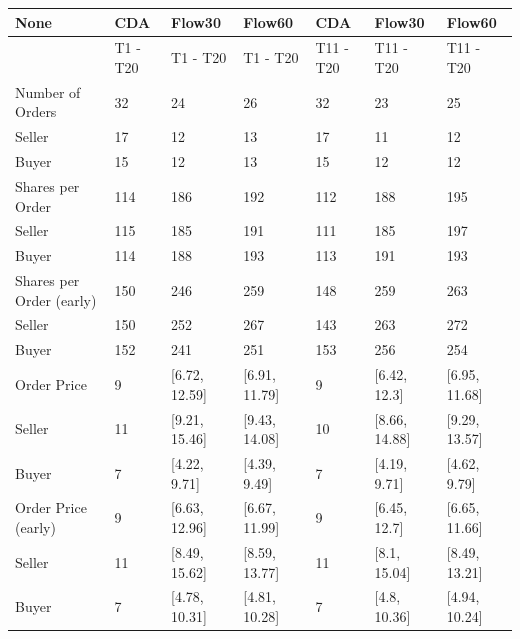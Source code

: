\begin{tabular}{lllllll}
\hline
 None                     & CDA      & Flow30        & Flow60        & CDA       & Flow30        & Flow60        \\
\hline
                          & T1 - T20 & T1 - T20      & T1 - T20      & T11 - T20 & T11 - T20     & T11 - T20     \\
 Number of Orders         & 32       & 24            & 26            & 32        & 23            & 25            \\
 Seller                   & 17       & 12            & 13            & 17        & 11            & 12            \\
 Buyer                    & 15       & 12            & 13            & 15        & 12            & 12            \\
 Shares per Order         & 114      & 186           & 192           & 112       & 188           & 195           \\
 Seller                   & 115      & 185           & 191           & 111       & 185           & 197           \\
 Buyer                    & 114      & 188           & 193           & 113       & 191           & 193           \\
 Shares per Order (early) & 150      & 246           & 259           & 148       & 259           & 263           \\
 Seller                   & 150      & 252           & 267           & 143       & 263           & 272           \\
 Buyer                    & 152      & 241           & 251           & 153       & 256           & 254           \\
 Order Price              & 9        & [6.72, 12.59] & [6.91, 11.79] & 9         & [6.42, 12.3]  & [6.95, 11.68] \\
 Seller                   & 11       & [9.21, 15.46] & [9.43, 14.08] & 10        & [8.66, 14.88] & [9.29, 13.57] \\
 Buyer                    & 7        & [4.22, 9.71]  & [4.39, 9.49]  & 7         & [4.19, 9.71]  & [4.62, 9.79]  \\
 Order Price (early)      & 9        & [6.63, 12.96] & [6.67, 11.99] & 9         & [6.45, 12.7]  & [6.65, 11.66] \\
 Seller                   & 11       & [8.49, 15.62] & [8.59, 13.77] & 11        & [8.1, 15.04]  & [8.49, 13.21] \\
 Buyer                    & 7        & [4.78, 10.31] & [4.81, 10.28] & 7         & [4.8, 10.36]  & [4.94, 10.24] \\

\end{tabular}
